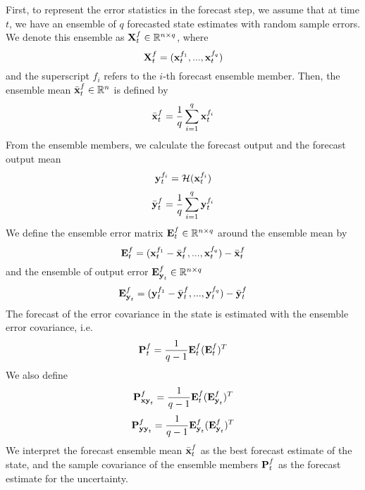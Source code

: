 First, to represent the error statistics in the forecast step, we assume that at time $t$, we have an ensemble of $q$ forecasted state estimates with random sample errors. 
We denote this ensemble as $\textbf{X}_t^f\in\mathbb{R}^{n\times q}$, where
\begin{equation}
\textbf{X}_t^f=(\textbf{x}_t^{f_1},...,\textbf{x}_t^{f_q})
\end{equation}\label{eq:ensemble}
and the superscript $f_i$ refers to the $i$-th forecast ensemble member. Then, the ensemble mean $\bar{\textbf{x}}_t^f\in\mathbb{R}^n$ is defined by
\begin{equation}
\bar{\textbf{x}}_t^f=\frac{1}{q}\sum_{i=1}^q \textbf{x}_t^{f_i}
\end{equation}\label{eq:xf}
From the ensemble members, we calculate the forecast output and the forecast output mean
\begin{equation}
\textbf{y}_t^{f_i} = \mathcal{H}(\textbf{x}_t^{f_i})
\end{equation}\label{eq:ensembleoutput}
\begin{equation}
\bar{\textbf{y}}_t^f=\frac{1}{q}\sum_{i=1}^q \textbf{y}_t^{f_i}
\end{equation}\label{eq:yf}
We define the ensemble error matrix $\textbf{E}_t^f\in\mathbb{R}^{n\times q}$ around the ensemble mean by
\begin{equation}
\textbf{E}_t^f=(\textbf{x}_t^{f_1}-\bar{\textbf{x}}_t^f,...,\textbf{x}_t^{f_q}) - \bar{\textbf{x}}_t^f
\end{equation}\label{eq:Ef}
and the ensemble of output error $\textbf{E}_{\textbf{y}_t}^f\in\mathbb{R}^{n\times q}$
\begin{equation}
\textbf{E}_{\textbf{y}_t}^f=(\textbf{y}_t^{f_1}-\bar{\textbf{y}}_t^f,...,\textbf{y}_t^{f_q}) - \bar{\textbf{y}}_t^f
\end{equation}\label{eq:Eyf}
The forecast of the error covariance in the state is estimated with the ensemble error covariance, i.e.
\begin{equation}
\textbf{P}_t^f = \frac{1}{q-1}\textbf{E}_t^f(\textbf{E}_t^f)^T
\end{equation}\label{eq:Pf}
We also define
\begin{equation}
\textbf{P}_{\textbf{x}\textbf{y}_t}^f = \frac{1}{q-1}\textbf{E}_t^f(\textbf{E}_{\textbf{y}_t}^f)^T
\end{equation}
\begin{equation}
\textbf{P}_{\textbf{y}\textbf{y}_t}^f = \frac{1}{q-1}\textbf{E}_{\textbf{y}_t}^f(\textbf{E}_{\textbf{y}_t}^f)^T
\end{equation}
We interpret the forecast ensemble mean $\bar{\textbf{x}}_t^f$ as the best forecast estimate of the state, and the sample covariance of the ensemble members $\textbf{P}_t^f$ as the forecast estimate for the uncertainty.\par

